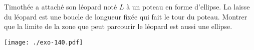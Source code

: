 Timothée a attaché son léopard noté $L$ à un poteau en forme d'ellipse. La laisse du léopard est une boucle de longueur fixée qui fait le tour du poteau. Montrer que la limite de la zone que peut parcourir le léopard est aussi une ellipse.
\begin{center}
\texttt{[image: ./exo-140.pdf]}
\end{center}